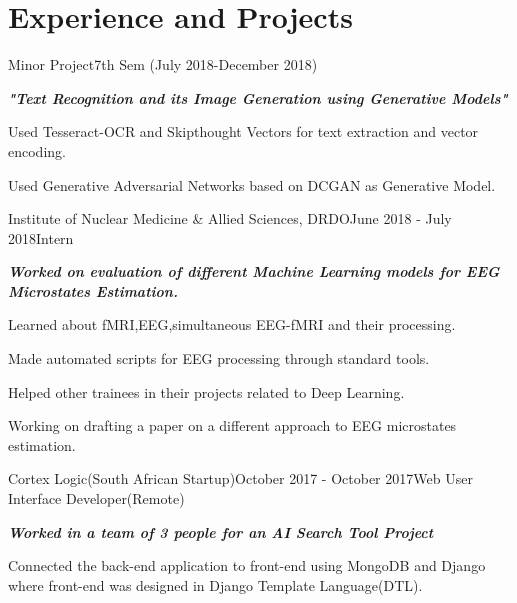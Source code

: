 \documentclass[letterpaper]{twentysecondcv} %
\begin{document}

\section{Experience and Projects}


\begin{rSubsection}{Minor Project}{7th Sem (July 2018-December 2018)}{}{}
	\item {\em \bf "Text Recognition and its Image Generation using Generative Models"}
	\item Used Tesseract-OCR and Skipthought Vectors for text extraction and vector encoding.
	\item Used Generative Adversarial Networks based on DCGAN as Generative Model.
\end{rSubsection}

\begin{rSubsection}{Institute of Nuclear Medicine \& Allied Sciences, DRDO}{June 2018 - July 2018}{Intern}{}
	\item {\em \bf Worked on evaluation of different Machine Learning models for EEG Microstates Estimation.}
	\item Learned about fMRI,EEG,simultaneous EEG-fMRI and their processing.
	\item Made automated scripts for EEG processing through standard tools. 
	\item Helped other trainees in their projects related to Deep Learning.
	\item Working on drafting a paper on a different approach to EEG microstates estimation.
\end{rSubsection}

\begin{rSubsection}{Cortex Logic(South African Startup)}{October 2017 - October 2017}{Web User Interface Developer(Remote)}{}
	\item {\em \bf Worked in a team of 3 people for an AI Search Tool Project}
	\item Connected the back-end application to front-end using MongoDB and Django where front-end was designed in Django Template Language(DTL).
\end{rSubsection}
\end{document}
